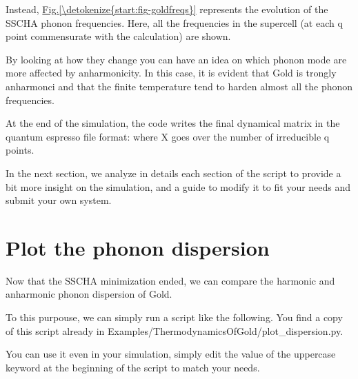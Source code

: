 \documentclass[a4paper,11pt,english]{sphinxmanual}
\begin{document}
\sphinxAtStartPar
Instead, \hyperref[\detokenize{start:fig-goldfreqs}]{Fig.\@ \ref{\detokenize{start:fig-goldfreqs}}} represents the evolution of the SSCHA phonon frequencies.
Here, all the frequencies in the supercell (at each q point commensurate with the calculation) are shown.

\sphinxAtStartPar
By looking at how they change you can have an idea on which phonon mode are more affected by anharmonicity. In this case, it is evident that Gold is trongly anharmonci and that the finite temperature tend to harden almost all the phonon frequencies.

\sphinxAtStartPar
At the end of the simulation, the code writes the final dynamical matrix in the quantum espresso file format:  where X goes over the number of irreducible q points.

\sphinxAtStartPar
In the next section, we analyze in details each section of the script to provide a bit more insight on the simulation, and a guide to modify it to fit your needs and submit your own system.


\section{Plot the phonon dispersion}
\label{\detokenize{start:plot-the-phonon-dispersion}}
\sphinxAtStartPar
Now that the SSCHA minimization ended, we can compare the harmonic and anharmonic phonon dispersion of Gold.

\sphinxAtStartPar
To this purpouse, we can simply run a script like the following. You find a copy of this script already in Examples/ThermodynamicsOfGold/plot\_dispersion.py.

\sphinxAtStartPar
You can use it even in your simulation, simply edit the value of the uppercase keyword at the beginning of the script to match your needs.
\end{document}
